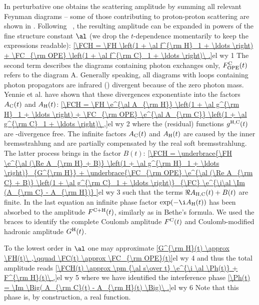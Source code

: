 

In perturbative  one obtains the scattering amplitude by summing all relevant Feynman diagrams -- some of those contributing to proton-proton scattering are shown in . Following \WaY\ , the resulting amplitude can be expanded in powers of the fine structure constant $\al$ (we drop the $t$-dependence momentarily to keep the expressions readable):
\eqref{\FCH = \FH \left(1 + \al f^{\rm H}_1 + \ldots \right) + \FC_{\rm OPE} \left(1 + \al f^{\rm C}_1 + \ldots \right)\ .}{el wy 1}
The second term describes the diagrams containing photon exchanges only, $F^{\rm C}_{\rm OPE}(t)$ refers to the diagram  A. Generally speaking, all diagrams with loops containing photon propagators are infrared () divergent because of the zero photon mass. Yennie et al.  have shown that these divergences exponentiate into the factors $A_{\rm C}(t)$ and $A_{\rm H}(t)$:
\eqref{\FCH = \FH \e^{\al A_{\rm H}} \left(1 + \al g^{\rm H}_1 + \ldots \right) + \FC_{\rm OPE} \e^{\al A_{\rm C}} \left(1 + \al g^{\rm C}_1 + \ldots \right)\ ,}{el wy 2}
where the (residual) functions $g^{\rm H, C}(t)$ are -divergence free. The infinite factors $A_{\rm C}(t)$ and $A_{\rm H}(t)$ are caused by the inner bremsstrahlung and are partially compensated by the real soft bremsstrahlung. The latter process brings in the factor $B(t)$:
\eqref{\FCH =
\underbrace{\FH \e^{\al (\Re A_{\rm H} + B)} \left(1 + \al g^{\rm H}_1 + \ldots \right)}_{G^{\rm H}}
+
\underbrace{\FC_{\rm OPE} \e^{\al (\Re A_{\rm C} + B)} \left(1 + \al g^{\rm C}_1 + \ldots \right)}_{\FC}
\e^{\i\al \Im (A_{\rm C} - A_{\rm H})}
}{el wy 3}
such that the terms $\Re A_{\rm H, C}(t) + B(t)$ are finite. In the last equation an infinite phase factor $\exp(-\i A_{\rm H}(t))$ has been absorbed to the amplitude $F^{\rm C+H}(t)$, similarly as in Bethe's formula. We used the braces to identify the complete Coulomb amplitude $F^{\rm C}(t)$ and Coulomb-modified hadronic amplitude $G^{\rm H}(t)$.

To the lowest order in $\al$ one may approximate
\eqref{G^{\rm H}(t) \approx \FH(t)\ ,\qquad \FC(t) \approx \FC_{\rm OPE}(t)}{el wy 4}
and thus the total amplitude reads
\eqref{\FCH(t) \approx \pm {\al s\over t} \e^{\i \al \Ph(t)} + F^{\rm H}(t)\ ,}{el wy 5}
where we have identified the interference phase
\eqref{\Ph(t) = \Im \Big( A_{\rm C}(t) - A_{\rm H}(t) \Big)\ .}{el wy 6}
Note that this phase is, by construction, a real function.


